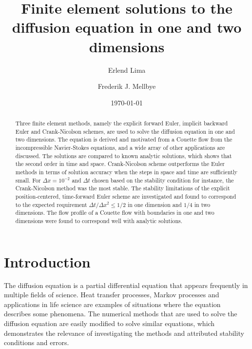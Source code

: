 \documentclass[aps,reprint]{revtex4-1}
\begin{document}
\title{Finite element solutions to the diffusion equation in one and two dimensions}
\author{Erlend Lima}
\author{Frederik J. Mellbye}
\date{\today}

\begin{abstract}
Three finite element methods, namely the explicit forward Euler, implicit backward Euler
and Crank-Nicolson schemes, are used to solve the diffusion equation in one and
two dimensions. The equation is derived and motivated from a Couette flow from the
incompressible Navier-Stokes equations, and a wide array of other applications
are discussed. The solutions are compared to known analytic solutions, which shows
that the second order in time and space. Crank-Nicolson scheme outperforms
the Euler methods in terms of solution accuracy when the steps in space and time are sufficiently small. For $\Delta x = 10^{-2}$ and $\Delta{t}$ chosen based on the stability condition for instance,
the Crank-Nicolson method was the most stable. The stability limitations of the
explicit position-centered, time-forward Euler scheme are investigated and found to
correspond to the expected requirement $\Delta{t}/\Delta{x}^2 \leq 1/2$ in one dimension
and $1/4$ in two dimensions. The flow profile of a Couette flow with boundaries in one and
two dimensions were found to correspond well with analytic solutions.
\end{abstract}
\maketitle
\tableofcontents
\makeatletter
\let\toc@pre\relax
\let\toc@post\relax
\makeatother

\newpage

\section{Introduction} \label{sec:introduction}
The diffusion equation is a partial differential equation that appears frequently in
multiple fields of science. Heat transfer processes, Markov processes
and applications in life science are examples of situations where the equation describes
some phenomena. The numerical methods that are used to solve the diffusion
equation are easily modified to solve similar equations, which demonstrates the relevance
of investigating the methods and attributed stability conditions and errors.
\end{document}
